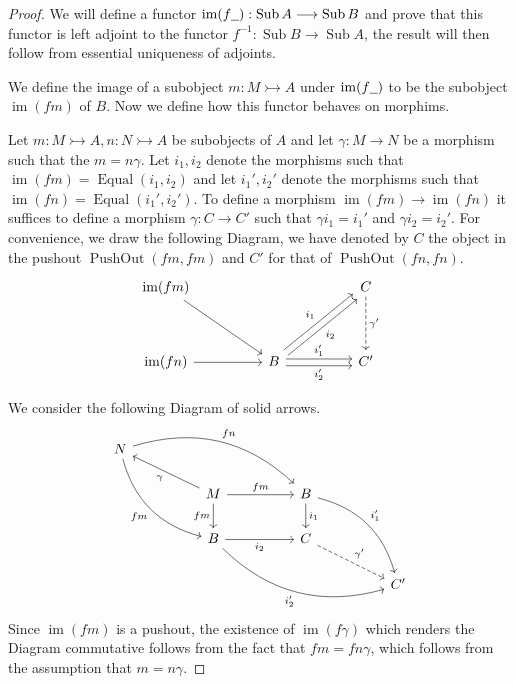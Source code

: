 \documentclass{tac}
\newcommand{\und}[1]{\underline{\hspace{#1 cm}}}
\newcommand{\lto}{\longrightarrow}
\begin{document}
	\begin{proof}
		We will define a functor $\operatorname{im}(f\und{0.2}): \operatorname{Sub}A \lto \operatorname{Sub}B$ and prove that this functor is left adjoint to the functor $f^{-1}: \operatorname{Sub}B \lto \operatorname{Sub}A$, the result will then follow from essential uniqueness of adjoints.
		
		We define the image of a subobject $m: M \rightarrowtail A$ under $\operatorname{im}(f\und{0.2})$ to be the subobject $\operatorname{im}(fm)$ of $B$. Now we define how this functor behaves on morphims.
		
		Let $m: M \rightarrowtail A, n:N \rightarrowtail A$ be subobjects of $A$ and let $\gamma: M \lto N$ be a morphism such that the $m = n\gamma$. Let $i_1,i_2$ denote the morphisms such that $\operatorname{im}(fm) = \operatorname{Equal}(i_1,i_2)$ and let $i_1',i_2'$ denote the morphisms such that $\operatorname{im}(fn) = \operatorname{Equal}(i_1',i_2')$. To define a morphism $\operatorname{im}(fm) \lto \operatorname{im}(fn)$ it suffices to define a morphism $\gamma: C \lto C'$ such that $\gamma i_1 = i_1'$ and $\gamma i_2 = i_2'$. For convenience, we draw the following Diagram, we have denoted by $C$ the object in the pushout $\operatorname{PushOut}(fm,fm)$ and $C'$ for that of $\operatorname{PushOut}(fn,fn)$.
		\begin{equation}
			\begin{tikzcd}[column sep = huge, row sep = huge]
				\operatorname{im}(fm)\arrow[dr] & & C\arrow[d,dashed,"{\gamma'}"]\\
				\operatorname{im}(fn)\arrow[r] & B\arrow[ur,shift left,"{i_1}"]\arrow[ur,shift right,swap,"{i_2}"]\arrow[r,shift left,"{i_1'}"]\arrow[r,shift right,swap,"{i_2'}"] & C'
			\end{tikzcd}
		\end{equation}
		
		
		We consider the following Diagram of solid arrows.
		\begin{equation}
			\begin{tikzcd}[column sep = huge]
				N\arrow[rrd, bend left,"{fn}"]\arrow[ddr,swap,bend right,"{fm}"]\\
				& M\arrow[r,"{fm}"]\arrow[d,swap,"{fm}"]\arrow[ul,"{\gamma}"] & B\arrow[d,"{i_1}"]\arrow[ddr,bend left,"{i_1'}"]\\
				& B\arrow[r,swap,"{i_2}"]\arrow[drr,swap,bend right,"{i_2'}"] & C\arrow[dr,dashed,"{\gamma'}"]\\
				& & & C'
			\end{tikzcd}
		\end{equation}
		Since $\operatorname{im}(fm)$ is a pushout, the existence of $\operatorname{im}(f\gamma)$ which renders the Diagram commutative follows from the fact that $fm = fn \gamma$, which follows from the assumption that $m = n \gamma$.
		

\end{proof}
\end{document}

